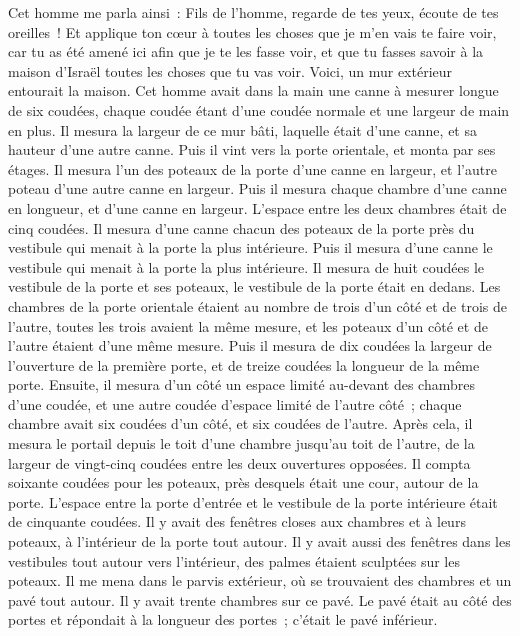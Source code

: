 \begin{multicols}{2}
Cet homme me parla ainsi~: Fils de l'homme, regarde de tes yeux, écoute de tes oreilles~! Et applique ton cœur à toutes les choses que je m'en vais te faire voir, car tu as été amené ici afin que je te les fasse voir, et que tu fasses savoir à la maison d'Israël toutes les choses que tu vas voir.
Voici, un mur extérieur entourait la maison. Cet homme avait dans la main une canne à mesurer longue de six coudées, chaque coudée étant d'une coudée normale et une largeur de main en plus. Il mesura la largeur de ce mur bâti, laquelle était d'une canne, et sa hauteur d'une autre canne.
Puis il vint vers la porte orientale, et monta par ses étages. Il mesura l'un des poteaux de la porte d'une canne en largeur, et l'autre poteau d'une autre canne en largeur.
Puis il mesura chaque chambre d'une canne en longueur, et d'une canne en largeur. L'espace entre les deux chambres était de cinq coudées. Il mesura d'une canne chacun des poteaux de la porte près du vestibule qui menait à la porte la plus intérieure.
Puis il mesura d'une canne le vestibule qui menait à la porte la plus intérieure.
Il mesura de huit coudées le vestibule de la porte et ses poteaux, le vestibule de la porte était en dedans.
Les chambres de la porte orientale étaient au nombre de trois d'un côté et de trois de l'autre, toutes les trois avaient la même mesure, et les poteaux d'un côté et de l'autre étaient d’une même mesure.
Puis il mesura de dix coudées la largeur de l'ouverture de la première porte, et de treize coudées la longueur de la même porte.
Ensuite, il mesura d'un côté un espace limité au-devant des chambres d'une coudée, et une autre coudée d'espace limité de l'autre côté~; chaque chambre avait six coudées d'un côté, et six coudées de l'autre.
Après cela, il mesura le portail depuis le toit d'une chambre jusqu'au toit de l'autre, de la largeur de vingt-cinq coudées entre les deux ouvertures opposées.
Il compta soixante coudées pour les poteaux, près desquels était une cour, autour de la porte.
L'espace entre la porte d'entrée et le vestibule de la porte intérieure était de cinquante coudées.
Il y avait des fenêtres closes aux chambres et à leurs poteaux, à l'intérieur de la porte tout autour. Il y avait aussi des fenêtres dans les vestibules tout autour vers l'intérieur, des palmes étaient sculptées sur les poteaux.
Il me mena dans le parvis extérieur, où se trouvaient des chambres et un pavé tout autour. Il y avait trente chambres sur ce pavé.
Le pavé était au côté des portes et répondait à la longueur des portes~; c'était le pavé inférieur.

\end{multicols}
